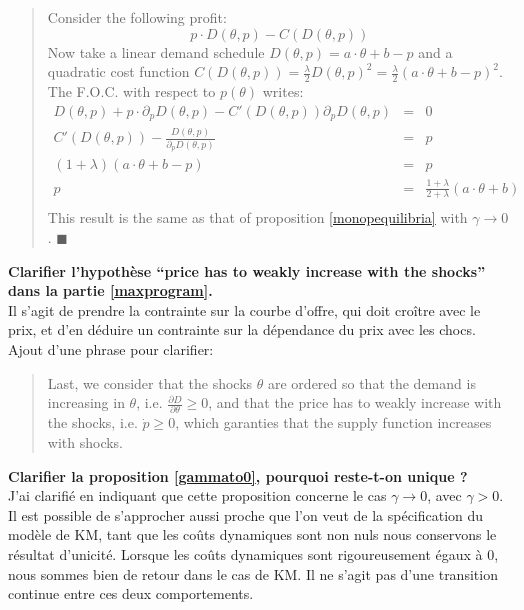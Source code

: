 \documentclass{article}
\newenvironment{proof}[1][Proof]{\begin{trivlist}
\item[\hskip \labelsep {\bfseries #1}]}{\end{trivlist}}
\newcommand{\qed}{$\blacksquare$}
\begin{document}
\begin{itemize}
\begin{quote}
\begin{proof}
Consider the following profit:
$$p\cdot D(\theta,p) - C(D(\theta,p))$$
Now take a linear demand schedule $D(\theta,p) = a\cdot \theta + b - p$ and a quadratic cost function $C(D(\theta,p)) = \frac{\lambda}{2} D(\theta,p)^2 = \frac{\lambda}{2}(a\cdot \theta + b - p)^2$.
The F.O.C. with respect to $p(\theta)$ writes:
\begin{eqnarray}
D(\theta,p)  + p\cdot \partial_p D(\theta,p) - C'(D(\theta,p))\partial_p D(\theta,p)  &=&0\\
C'(D(\theta,p)) - \frac{D(\theta,p)}{\partial_p D(\theta,p)} & =&p\\
(1+\lambda)(a\cdot\theta+b-p)&=&p\\
p&=&\frac{1+\lambda}{2+\lambda}(a\cdot\theta+b)\\
\end{eqnarray}
This result is the same as that of proposition  \ref{monopequilibria} with $\gamma \to 0$. \qed
\end{proof} 
\end{quote}

\item \textbf{Clarifier l'hypothèse ``price has to weakly increase with the shocks'' dans la partie \ref{maxprogram}.}\\

Il s'agit de prendre la contrainte sur la courbe d'offre, qui doit croître avec le prix, et d'en déduire un contrainte sur la dépendance du prix avec les chocs. Ajout d'une phrase pour clarifier: 

\begin{quote}
Last, we consider that the shocks $\theta$ are ordered so that the demand is increasing in $\theta$, i.e. $\frac{\partial D}{\partial\theta}\geq0$, and that the price has to weakly increase with the shocks, i.e. $\dot{p}\geq0$, which garanties that the supply function increases with shocks.
\end{quote}

\item \textbf{Clarifier la proposition \ref{gammato0}, pourquoi reste-t-on unique ? }\\

J'ai clarifié en indiquant que cette proposition concerne le cas $\gamma\to0$, avec $\gamma>0$. Il est possible de s'approcher aussi proche que l'on veut de la spécification du modèle de KM, tant que les coûts dynamiques sont non nuls nous conservons le résultat d'unicité. Lorsque les coûts dynamiques sont rigoureusement égaux à 0, nous sommes bien de retour dans le cas de KM. Il ne s'agit pas d'une transition continue entre ces deux comportements.


\end{itemize}
\end{document}
